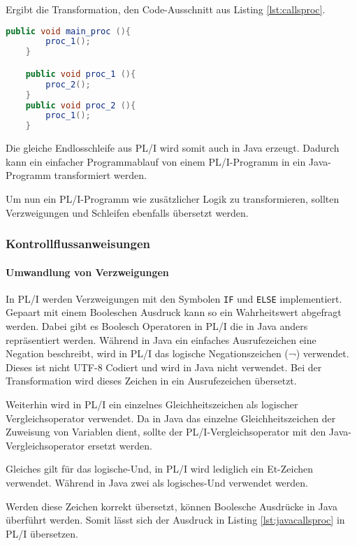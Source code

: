 Ergibt die Transformation, den Code-Ausschnitt aus Listing \ref{lst:callsproc}.

\begin{lstlisting}[language=Java, caption=\"Ubersetzung des Call-Statments, label={lst:javacallsproc}]
	public void main_proc (){
		proc_1();
	}

	public void proc_1 (){
		proc_2();
	}
	public void proc_2 (){
		proc_1();
	}
\end{lstlisting} 

Die gleiche Endlosschleife aus PL/I wird somit auch in Java erzeugt.
Dadurch kann ein einfacher Programmablauf von einem PL/I-Programm in ein Java-Programm transformiert werden.


Um nun ein PL/I-Programm wie zusätzlicher Logik zu transformieren, sollten Verzweigungen und Schleifen ebenfalls übersetzt werden.

\pagebreak
\subsubsection{Kontrollflussanweisungen}
\paragraph{Umwandlung von Verzweigungen}

In PL/I werden Verzweigungen mit den Symbolen \verb+IF+ und \verb+ELSE+ implementiert. 
Gepaart mit einem Booleschen Ausdruck kann so ein Wahrheitswert abgefragt werden.
Dabei gibt es Boolesch Operatoren in PL/I die in Java anders repräsentiert werden.
Während in Java ein einfaches Ausrufezeichen eine Negation beschreibt, wird in PL/I das logische Negationszeichen (¬) verwendet. Dieses ist nicht UTF-8 Codiert und wird in Java nicht verwendet. Bei der Transformation wird dieses Zeichen in ein Ausrufezeichen übersetzt.

Weiterhin wird in PL/I ein einzelnes Gleichheitszeichen als logischer Vergleichsoperator verwendet. Da in Java das einzelne Gleichheitszeichen der Zuweisung von Variablen dient, sollte der PL/I-Vergleichsoperator mit den Java-Vergleichsoperator ersetzt werden.

Gleiches gilt für das logische-Und, in PL/I wird lediglich ein Et-Zeichen verwendet. Während in Java zwei als logisches-Und verwendet werden.

Werden diese Zeichen korrekt übersetzt, können Boolesche Ausdrücke in Java überführt werden.
Somit lässt sich der Ausdruck in Listing \ref{lst:javacallsproc} in PL/I übersetzen.

